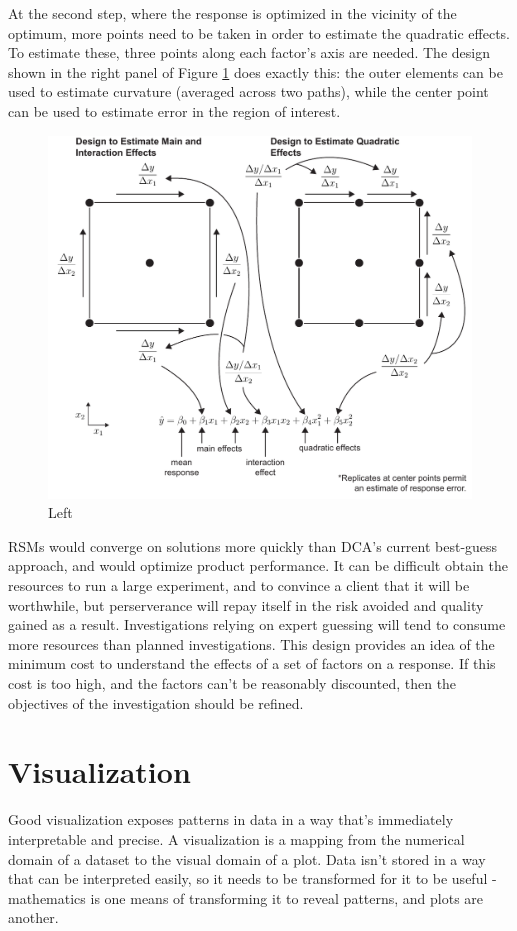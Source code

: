 \documentclass[11pt,a4paper,article]{memoir} %
\begin{document}
At the second step, where the response is optimized in the vicinity of the optimum, more points need to be taken in order to estimate the quadratic effects. To estimate these, three points along each factor's axis are needed. The design shown in the right panel of Figure \ref{fig:rsm_design} does exactly this: the outer elements can be used to estimate curvature (averaged across two paths), while the center point can be used to estimate error in the region of interest.
\begin{figure}
\includegraphics[width=\textwidth]{RSM_design.pdf}
\caption{Left}
\label{fig:rsm_design}
\end{figure}

RSMs would converge on solutions more quickly than DCA's current best-guess approach, and would optimize product performance. It can be difficult obtain the resources to run a large experiment, and to convince a client that it will be worthwhile, but perserverance will repay itself in the risk avoided and quality gained as a result. Investigations relying on expert guessing will tend to consume more resources than planned investigations. This design provides an idea of the minimum cost to understand the effects of a set of factors on a response. If this cost is too high, and the factors can't be reasonably discounted, then the objectives of the investigation should be refined.

\newpage
\section{Visualization}
\label{suggested_vis}
Good visualization exposes patterns in data in a way that's immediately interpretable and precise. A visualization is a mapping from the numerical domain of a dataset to the visual domain of a plot. Data isn't stored in a way that can be interpreted easily, so it needs to be transformed for it to be useful - mathematics is one means of transforming it to reveal patterns, and plots are another.
\end{document}
